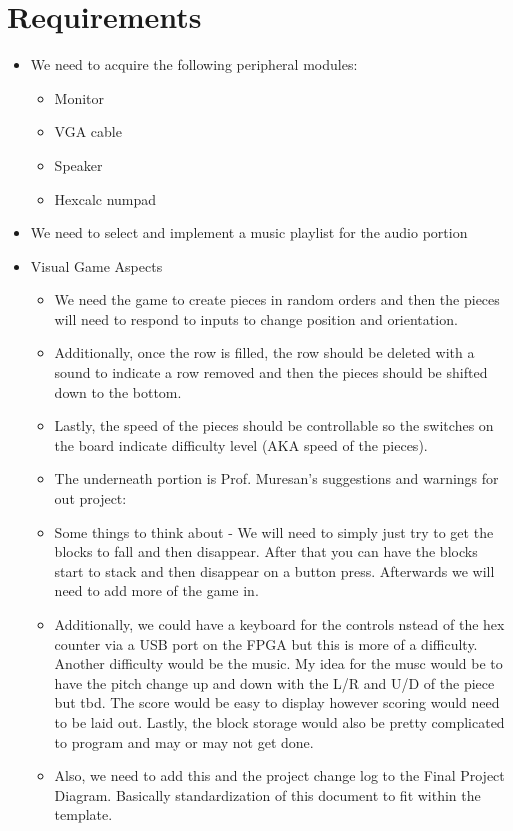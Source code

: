 \section{Requirements}
    \begin{itemize}
        \item We need to acquire the following peripheral modules:
            \begin{itemize}
                \item Monitor
                \item VGA cable
                \item Speaker
                \item Hexcalc numpad
            \end{itemize}
        \item We need to select and implement a music playlist for the audio portion
        \item Visual Game Aspects
        \begin{itemize}
            \item We need the game to create pieces in random orders and then the pieces will need to respond to inputs to change position and orientation. 
            \item Additionally, once the row is filled, the row should be deleted with a sound to indicate a row removed and then the pieces should be shifted down to the bottom.
            \item Lastly, the speed of the pieces should be controllable so the switches on the board indicate difficulty level (AKA speed of the pieces).
            \item The underneath portion is Prof. Muresan's suggestions and warnings for out project:
            \item Some things to think about - We will need to simply just try to get the blocks to fall and then disappear. After that you can have the blocks start to stack and then disappear on a button press. Afterwards we will need to add more of the game in. 
            \item Additionally, we could have a keyboard for the controls nstead of the hex counter via a USB port on the FPGA but this is more of a difficulty. Another difficulty would be the music. My idea for the musc would be to have the pitch change up and down with the L/R and U/D of the piece but tbd. The score would be easy to display however scoring would need to be laid out. Lastly, the block storage would also be pretty complicated to program and may or may not get done. 
            \item Also, we need to add this and the project change log to the Final Project Diagram. Basically standardization of this document to fit within the template.
        \end{itemize}
    \end{itemize}
